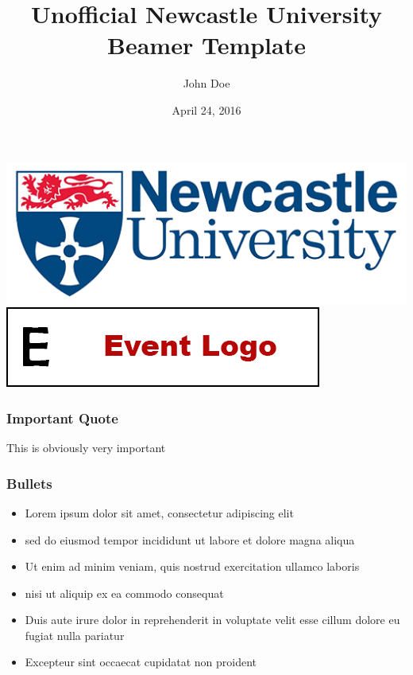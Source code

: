 \documentclass{beamer}
\title[NCL Uni Beamer Template]{Unofficial Newcastle University Beamer Template}
\author[J. Doe]{John Doe}
\institute[Newcastle Univ.] {Newcastle University \\ \medskip \textit{J.Doe@newcastle.ac.uk}}
\date[April 2016]{April 24, 2016}
\begin{document}
\begin{frame}
    \titlepage
    \begin{center}
        \includegraphics[scale=0.2]{ncluni-logo.png}
        \hspace{10pt}
        \includegraphics[scale=0.4]{event-logo.png}
    \end{center}
\end{frame}

\begin{frame}
    \frametitle{Important Quote}
    \Huge{This is obviously very important}
\end{frame}

\begin{frame}
    \frametitle{Bullets}
    \Large{
    \begin{itemize}
        \item Lorem ipsum dolor sit amet, consectetur adipiscing elit
        \item sed do eiusmod tempor incididunt ut labore et dolore magna aliqua
        \item Ut enim ad minim veniam, quis nostrud exercitation ullamco laboris
        \item nisi ut aliquip ex ea commodo consequat
        \item Duis aute irure dolor in reprehenderit in voluptate velit esse cillum dolore eu fugiat nulla pariatur
        \item Excepteur sint occaecat cupidatat non proident
    \end{itemize}
    }
\end{frame}
\end{document}
